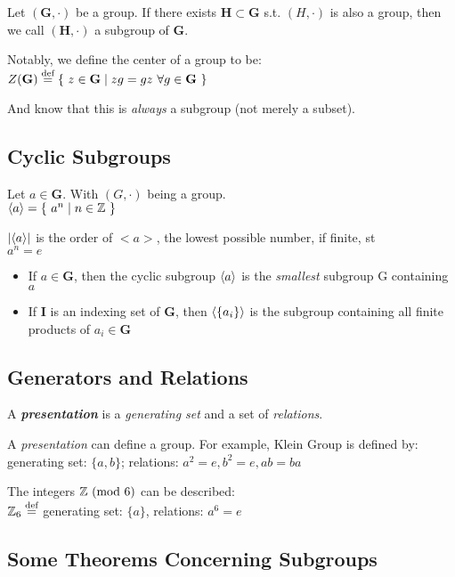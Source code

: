 \documentclass{article}
\begin{document}
  Let $(\mathbf{G},\cdot)$ be a group. If there exists $\mathbf{H} \subset
  \mathbf{G}$ s.t.  $(H,\cdot)$ is also a group, then we call
  $(\mathbf{H},\cdot)$ a subgroup of $\mathbf{G}$.

  Notably, we define the center of a group to be: \\
  $Z(\mathbf{G}) \stackrel{\text{def}}{=} \{\ z \in \mathbf{G} \mid zg = gz \ \forall g \in \mathbf{G}\ \}$

  And know that this is \emph{always} a subgroup (not merely a subset).

  \pagebreak
  \subsection{Cyclic Subgroups}

  Let $a \in \mathbf{G}$. With $(G,\cdot)$ being a group.\\
  $\langle a \rangle = \{\ a^n \mid n \in \mathbb{Z}\ \}$

  $|\langle a \rangle|$ is the order of $<a>$, the lowest possible number, if finite, st\\
  $a^n = e$

  \begin{itemize}
    \item
      If $a \in \mathbf{G}$, then the cyclic subgroup $\langle a \rangle$ is the
      \emph{smallest} subgroup G containing $a$ 
    \item
      If $\mathbf{I}$ is an indexing set of $\mathbf{G}$, then $\langle \{a_i\} \rangle$ is the
      subgroup containing all finite products of $a_i \in \mathbf{G}$
  \end{itemize}

  \subsection{Generators and Relations}

   A \emph{\bf presentation} is a \emph{generating set} and a set
  of \emph{relations}.

  A \emph{presentation} can define a group. For example, Klein Group is defined by:\\
    generating set: $\{a, b\}$; relations: $a^2 = e, b^2 = e, ab = ba$

  The integers $\mathbb{Z} \ (\textrm{mod}\ 6)$ can be described:\\
    $\mathbb{Z}_6 \stackrel{\text{def}}{=} $ generating set: $\{a\}$, relations: $a^6=e$

  \pagebreak
  \subsection{Some Theorems Concerning Subgroups}
\end{document}
